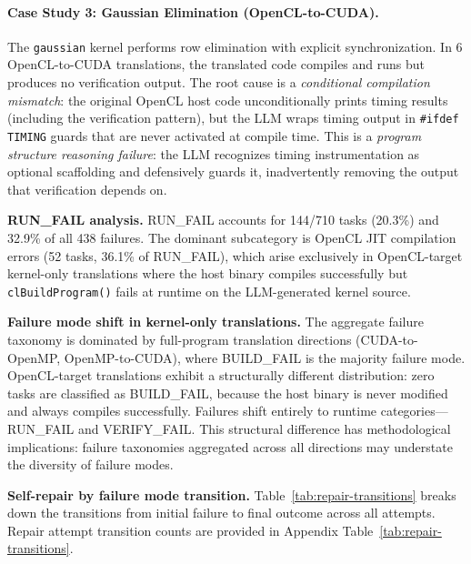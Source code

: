 \documentclass[conference]{IEEEtran}
\begin{document}
\paragraph{Case Study 3: Gaussian Elimination (OpenCL-to-CUDA).}
The \texttt{gaussian} kernel performs row elimination with explicit
synchronization. In 6 OpenCL-to-CUDA translations, the translated
code compiles and runs but produces no verification output.
The root cause is a \emph{conditional compilation mismatch}: the
original OpenCL host code unconditionally prints timing results
(including the verification pattern), but the LLM wraps timing
output in \texttt{\#ifdef TIMING} guards that are never activated
at compile time. This is a \emph{program structure reasoning failure}:
the LLM recognizes timing instrumentation as optional scaffolding
and defensively guards it, inadvertently removing the output
that verification depends on.

\textbf{RUN\_FAIL analysis.} RUN\_FAIL accounts for 144/710 tasks (20.3\%) and 32.9\% of all 438 failures. The dominant subcategory is OpenCL JIT compilation errors (52 tasks, 36.1\% of RUN\_FAIL), which arise exclusively in OpenCL-target kernel-only translations where the host binary compiles successfully but \texttt{clBuildProgram()} fails at runtime on the LLM-generated kernel source.

\textbf{Failure mode shift in kernel-only translations.} The aggregate failure taxonomy is dominated by full-program translation directions (CUDA-to-OpenMP, OpenMP-to-CUDA), where BUILD\_FAIL is the majority failure mode. OpenCL-target translations exhibit a structurally different distribution: zero tasks are classified as BUILD\_FAIL, because the host binary is never modified and always compiles successfully. Failures shift entirely to runtime categories---RUN\_FAIL and VERIFY\_FAIL. This structural difference has methodological implications: failure taxonomies aggregated across all directions may understate the diversity of failure modes.

\textbf{Self-repair by failure mode transition.} Table~\ref{tab:repair-transitions} breaks down the transitions from initial failure to final outcome across all attempts.
Repair attempt transition counts are provided in Appendix Table~\ref{tab:repair-transitions}.
\end{document}
